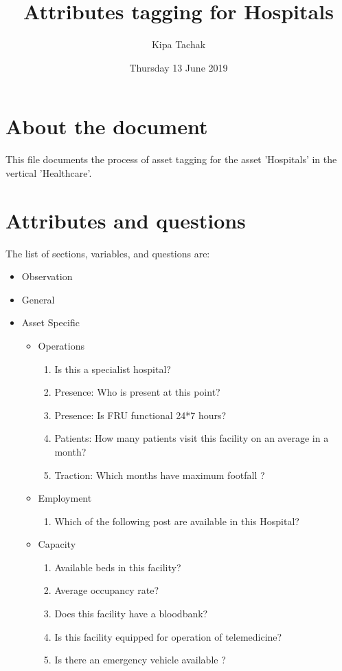 \documentclass[oneside]{article}
\title{Attributes tagging for Hospitals}
\author{Kipa Tachak}
\date{Thursday 13 June 2019}
\begin{document}
\maketitle

\section{About the document}
This file documents the process of asset tagging for the asset 'Hospitals' in the
vertical 'Healthcare'.

\section{Attributes and questions}
The list of sections, variables, and questions are:
    \begin{itemize}
    \item Observation
    \item General
    \item Asset Specific
    \begin{itemize}
\item Operations
\begin{enumerate}
\item  Is this a specialist hospital?
\item Presence: Who is present at this point?
\item Presence: Is FRU functional 24*7 hours?
\item Patients: How many patients visit this facility on an average in a month?
\item Traction: Which months have maximum footfall ?
\end{enumerate}

\item Employment
\begin{enumerate}
\item  Which of the following post are available in this Hospital?
\end{enumerate}

\item Capacity
\begin{enumerate}
\item  Available beds in this facility?
\item  Average occupancy rate?
\item  Does this facility have a bloodbank?
\item  Is this facility equipped for operation of telemedicine?
\item  Is there an emergency vehicle available ?
\end{enumerate}


\end{itemize}
\end{itemize}
\end{document}
